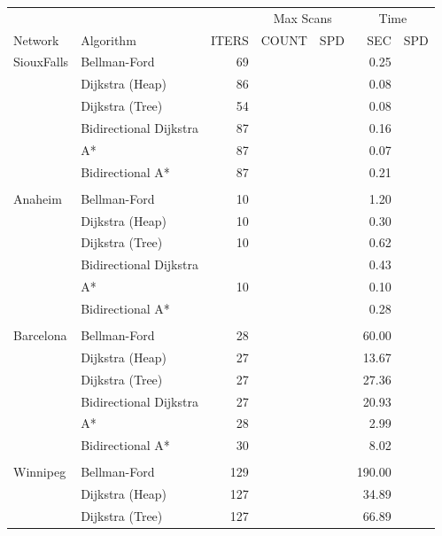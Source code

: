\begin{table}
    \centering
    \begin{tabular}{l l r rr rr } \toprule
        & & & \multicolumn{2}{c}{Max Scans} & \multicolumn{2}{c}{Time} \\ 
        \cmidrule(lr){4-5}
        \cmidrule(lr){6-7}
        Network & Algorithm & ITERS & COUNT & SPD                     & SEC & SPD \\ 
        \cmidrule(lr){1-1}
        \cmidrule(lr){2-2}
        \cmidrule(lr){3-3}
        \cmidrule(lr){4-4}
        \cmidrule(lr){5-5}
        \cmidrule(lr){6-6}
        \cmidrule(lr){7-7}
        SiouxFalls    & Bellman-Ford     & 69 & & & 0.25 & \\
        & Dijkstra (Heap) & 86 & & & 0.08 & \\
        & Dijkstra (Tree) & 54 & & & 0.08 & \\
        & Bidirectional Dijkstra & 87 & & & 0.16 & \\
        & A*    & 87 & & & 0.07 & \\
        & Bidirectional A* & 87 & & & 0.21 & \\ \\
        Anaheim       & Bellman-Ford    & 10 & & & 1.20 & \\
        & Dijkstra (Heap) & 10 & & & 0.30 & \\
        & Dijkstra (Tree) & 10 & & & 0.62 & \\
        & Bidirectional Dijkstra  & & & & 0.43 & \\
        & A*    & 10 & & & 0.10 & \\
        & Bidirectional A* & & & & 0.28 & \\ \\
        Barcelona     & Bellman-Ford    & 28 & & & 60.00 & \\
        & Dijkstra (Heap) & 27 & & & 13.67 & \\
        & Dijkstra (Tree) & 27 & & & 27.36 & \\
        & Bidirectional Dijkstra  & 27 & & & 20.93 & \\
        & A*    & 28 & & &  2.99 & \\
        & Bidirectional A* & 30 & & & 8.02 & \\ \\
        Winnipeg      & Bellman-Ford    & 129 & & & 190.00 & \\
        & Dijkstra (Heap) & 127 & & &  34.89 & \\
        & Dijkstra (Tree) & 127 & & &  66.89 & \\

\end{tabular}
\end{table}
